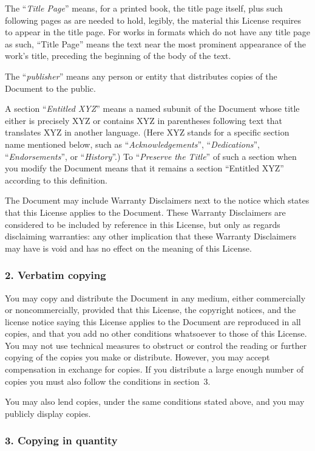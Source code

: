 \documentclass[a4paper,openany]{book}
\begin{document}
\begin{results}
The ``\emph{Title Page}'' means, for a printed book, the title page itself,
plus such following pages as are needed to hold, legibly, the material
this License requires to appear in the title page. For works in
formats which do not have any title page as such, ``Title Page'' means
the text near the most prominent appearance of the work's title,
preceding the beginning of the body of the text.

The ``\emph{publisher}'' means any person or entity that distributes
copies of the Document to the public.

A section ``\emph{Entitled XYZ}'' means a named subunit of the Document whose
title either is precisely XYZ or contains XYZ in parentheses following
text that translates XYZ in another language. (Here XYZ stands for a
specific section name mentioned below, such as ``\emph{Acknowledgements}'',
``\emph{Dedications}'', ``\emph{Endorsements}'', or ``\emph{History}''.) 
To ``\emph{Preserve the Title}''
of such a section when you modify the Document means that it remains a
section ``Entitled XYZ'' according to this definition.

The Document may include Warranty Disclaimers next to the notice which
states that this License applies to the Document. These Warranty
Disclaimers are considered to be included by reference in this
License, but only as regards disclaiming warranties: any other
implication that these Warranty Disclaimers may have is void and has
no effect on the meaning of this License.

\subsubsection*{2. Verbatim copying}

You may copy and distribute the Document in any medium, either
commercially or noncommercially, provided that this License, the
copyright notices, and the license notice saying this License applies
to the Document are reproduced in all copies, and that you add no other
conditions whatsoever to those of this License. You may not use
technical measures to obstruct or control the reading or further
copying of the copies you make or distribute. However, you may accept
compensation in exchange for copies. If you distribute a large enough
number of copies you must also follow the conditions in section~3.

You may also lend copies, under the same conditions stated above, and
you may publicly display copies.

\subsubsection*{3. Copying in quantity}


\end{results}
\end{document}
